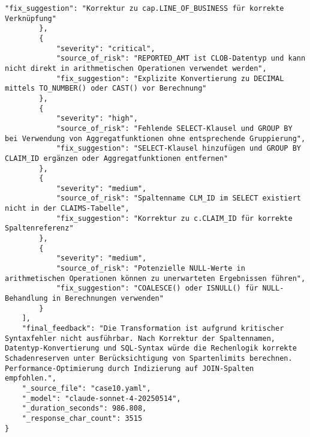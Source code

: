 \begin{lstlisting}[caption={Ausgabe: Claude Sonnet 4 Anwendungsfall 10 Hauptdurchlauf},label={claude_case10_prompt1}]
            "fix_suggestion": "Korrektur zu cap.LINE_OF_BUSINESS für korrekte Verknüpfung"
        },
        {
            "severity": "critical",
            "source_of_risk": "REPORTED_AMT ist CLOB-Datentyp und kann nicht direkt in arithmetischen Operationen verwendet werden",
            "fix_suggestion": "Explizite Konvertierung zu DECIMAL mittels TO_NUMBER() oder CAST() vor Berechnung"
        },
        {
            "severity": "high",
            "source_of_risk": "Fehlende SELECT-Klausel und GROUP BY bei Verwendung von Aggregatfunktionen ohne entsprechende Gruppierung",
            "fix_suggestion": "SELECT-Klausel hinzufügen und GROUP BY CLAIM_ID ergänzen oder Aggregatfunktionen entfernen"
        },
        {
            "severity": "medium",
            "source_of_risk": "Spaltenname CLM_ID im SELECT existiert nicht in der CLAIMS-Tabelle",
            "fix_suggestion": "Korrektur zu c.CLAIM_ID für korrekte Spaltenreferenz"
        },
        {
            "severity": "medium",
            "source_of_risk": "Potenzielle NULL-Werte in arithmetischen Operationen können zu unerwarteten Ergebnissen führen",
            "fix_suggestion": "COALESCE() oder ISNULL() für NULL-Behandlung in Berechnungen verwenden"
        }
    ],
    "final_feedback": "Die Transformation ist aufgrund kritischer Syntaxfehler nicht ausführbar. Nach Korrektur der Spaltennamen, Datentyp-Konvertierung und SQL-Syntax würde die Rechenlogik korrekte Schadenreserven unter Berücksichtigung von Spartenlimits berechnen. Performance-Optimierung durch Indizierung auf JOIN-Spalten empfohlen.",
    "_source_file": "case10.yaml",
    "_model": "claude-sonnet-4-20250514",
    "_duration_seconds": 986.808,
    "_response_char_count": 3515
}
\end{lstlisting}

